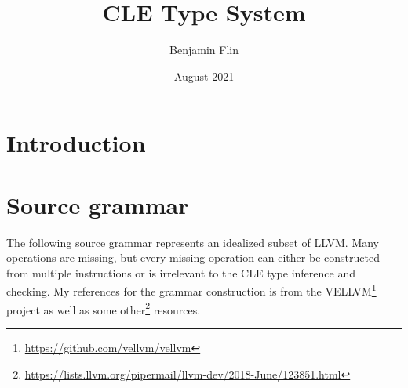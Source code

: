 \documentclass{article}
\title{CLE Type System}
\author{Benjamin Flin}
\date{August 2021}
\begin{document}
\maketitle

\section{Introduction}

\section{Source grammar}
The following source grammar represents an idealized subset of LLVM. 
Many operations are missing, but every missing operation can either be constructed from multiple instructions or is irrelevant to the CLE type inference and checking. My references for the grammar construction is from the VELLVM\footnote{\url{https://github.com/vellvm/vellvm}} project as well as some other\footnote{\url{https://lists.llvm.org/pipermail/llvm-dev/2018-June/123851.html}} resources.
\end{document}
